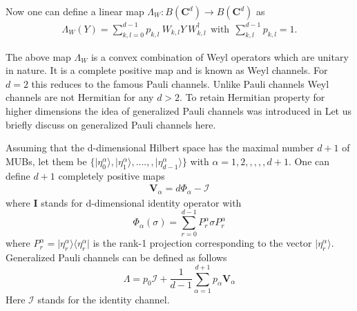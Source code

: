 \documentclass[12pt]{amsart}
\numberwithin{equation}{section}
\begin{document}
 Now one can define a linear map $\Lambda_W : B\left(\mathbf{C}^d\right) \rightarrow B\left(\mathbf{C}^d\right)$ as                                                                                                                                                                                      \begin{eqnarray*}
    \Lambda_W (Y) = \sum_{k,l=0}^{d-1} p_{k,l}~ W_{k,l} Y~ W^{\dagger}_{k,l} ~~\text{with} ~~ \sum^{d-1}_{k,l} p_{k,l} = 1.
\end{eqnarray*}

The above map $\Lambda_W$ is a convex combination of Weyl operators which are unitary in nature. It is a complete positive map and is known as Weyl channels. For $d=2$ this reduces to the famous Pauli channels. Unlike Pauli channels Weyl channels are not Hermitian for any $d > 2$. To retain Hermitian property for higher dimensions the idea of generalized Pauli channels was introduced in \cite{CS2016} 
Let us briefly discuss on generalized Pauli channels here. 

  Assuming that the d-dimensional Hilbert space has the maximal number $d+1$ of MUBs, let them be $\lbrace  \vert \eta^{\alpha}_0 \rangle,\vert \eta^{\alpha}_1 \rangle, ....,, \vert \eta^{\alpha}_{d-1} \rangle \rbrace$ with $\alpha=1, 2,,,,,d+1$. One can define $d+1$ completely positive maps 
\begin{eqnarray*}
    \mathbf{V}_\alpha = d \Phi_\alpha - \mathcal{I}
\end{eqnarray*}
where $\mathbf{I}$ stands for d-dimensional identity operator 
with \begin{equation} \label{proj}
    \Phi_\alpha (\sigma)=\sum_{r=0}^{d-1} P_r^{\alpha} \sigma  P_r^{\alpha}
\end{equation}
where $P_r^{\alpha} = \vert \eta^{\alpha}_r \rangle\langle \eta^{\alpha}_r \vert $ is the rank-1 projection corresponding to the vector $\vert \eta^{\alpha}_{r} \rangle$.  Generalized Pauli channels can be defined as follows
\begin{equation}\label{GPauli}
    \Lambda = p_0 \mathcal{I}+\frac{1}{d-1} \sum_{\alpha=1}^{d+1} p_{\alpha} \mathbf{V}_\alpha
\end{equation}
Here $\mathcal{I}$ stands for the identity channel.\\
\end{document}
